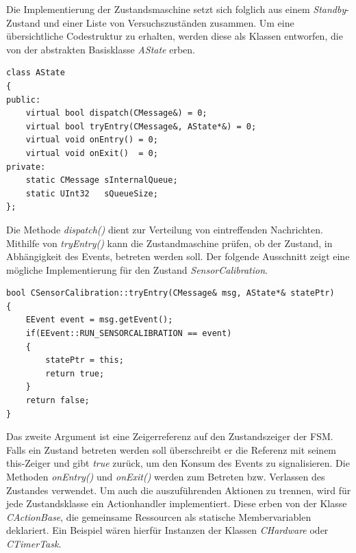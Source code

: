 Die Implementierung der Zustandsmaschine setzt sich folglich aus einem \textit{Standby}-Zustand und einer Liste von Versuchszuständen zusammen. Um eine übersichtliche Codestruktur zu erhalten, werden diese als Klassen entworfen, die von der abstrakten Basisklasse \textit{AState} erben.
\begin{lstlisting}[caption={Angepasste Implementierung der abstrakten Zustandsklasse},captionpos=b]
class AState
{
public:
	virtual bool dispatch(CMessage&) = 0;
	virtual bool tryEntry(CMessage&, AState*&) = 0;
	virtual void onEntry() = 0;
	virtual void onExit()  = 0;
private:
	static CMessage sInternalQueue;
	static UInt32   sQueueSize;
};
\end{lstlisting}
Die Methode \textit{dispatch()} dient zur Verteilung von eintreffenden Nachrichten. Mithilfe von \textit{tryEntry()} kann die Zustandmaschine prüfen, ob der Zustand, in Abhängigkeit des Events, betreten werden soll. Der folgende Ausschnitt zeigt eine mögliche Implementierung für den Zustand \textit{SensorCalibration}.
\begin{lstlisting}[caption={Beispielhafte Definition der Methode \textit{tryEntry()}},captionpos=b]
bool CSensorCalibration::tryEntry(CMessage& msg, AState*& statePtr)
{
	EEvent event = msg.getEvent();
	if(EEvent::RUN_SENSORCALIBRATION == event)
	{
		statePtr = this;
		return true;
	}
	return false;
}
\end{lstlisting}
Das zweite Argument ist eine Zeigerreferenz auf den Zustandszeiger der FSM. Falls ein Zustand betreten werden soll überschreibt er die Referenz mit seinem this-Zeiger und gibt \textit{true} zurück, um den Konsum des Events zu signalisieren. Die Methoden \textit{onEntry()} und \textit{onExit()} werden zum Betreten bzw. Verlassen des Zustandes verwendet. Um auch die auszuführenden Aktionen zu trennen, wird für jede Zustandsklasse ein Actionhandler implementiert. Diese erben von der Klasse \textit{CActionBase}, die gemeinsame Ressourcen als statische Membervariablen deklariert. Ein Beispiel wären hierfür Instanzen der Klassen \textit{CHardware} oder \textit{CTimerTask}.


